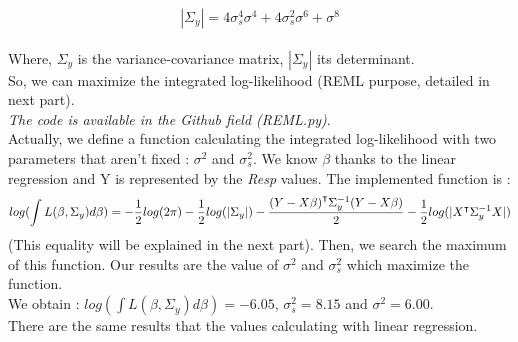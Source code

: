 \documentclass{article}
\begin{document}
\[|\Sigma_y| = 4\sigma_s^4\sigma^4+4\sigma_s^2\sigma^6+\sigma^8\]
\\
Where, $\Sigma_y$ is the variance-covariance matrix, $|\Sigma_y|$ its determinant.\\
So, we can maximize the integrated log-likelihood (REML purpose, detailed in next part).\\
\textit{The code is available in the Github field (REML.py)}.\\
Actually, we define a function calculating the integrated log-likelihood with two parameters that aren't fixed : $\sigma^2$ and $\sigma_s^2$. We know $\beta$ thanks to the linear regression and Y is represented by the \textit{Resp} values. The implemented function is :
\[ log(\int L(\beta, \Sigma_y)d\beta)=-\frac{1}{2}log(2\pi)-\frac{1}{2}log(|\Sigma_y|)-\frac{{(Y-X\beta)}^\intercal\Sigma_y^{-1}(Y-X\beta)}{2}-\frac{1}{2}log(|{X}^\intercal\Sigma_y^{-1}X|)\] 
(This equality will be explained in the next part). Then, we search the maximum of this function. Our results are the value of $\sigma^2$ and $\sigma_s^2$ which maximize the function.\\
We obtain : $log(\int L(\beta, \Sigma_y)d\beta)=-6.05$, $\sigma_s^2 = 8.15$ and $\sigma^2=6.00$. \\
There are the same results that the values calculating with linear regression.

\end{document}
